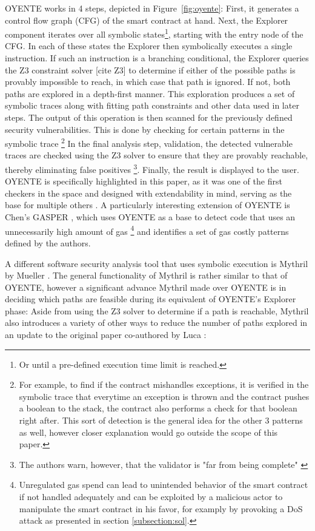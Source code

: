 \documentclass[letterpaper,twocolumn,10pt]{article}
\begin{document}
OYENTE works in 4 steps, depicted in Figure~\ref{fig:oyente}: First, it generates a control flow graph (CFG) of the smart contract at hand. Next, the Explorer component iterates over all symbolic states\footnote{Or until a pre-defined execution time limit is reached.}, starting with the entry node of the CFG. In each of these states the Explorer then symbolically executes a single instruction. If such an instruction is a branching conditional, the Explorer queries the Z3 constraint solver [cite Z3] to determine if either of the possible paths is provably impossible to reach, in which case that path is ignored. If not, both paths are explored in a depth-first manner. This exploration produces a set of symbolic traces along with fitting path constraints and other data used in later steps. The output of this operation is then scanned for the previously defined security vulnerabilities. This is done by checking for certain patterns in the symbolic trace \footnote{For example, to find if the contract mishandles exceptions, it is verified in the symbolic trace that everytime an exception is thrown and the contract pushes a boolean to the stack, the contract also performs a check for that boolean right after. This sort of detection is the general idea for the other 3 patterns as well, however closer explanation would go outside the scope of this paper.} In the final analysis step, validation, the detected vulnerable traces are checked using the Z3 solver to ensure that they are provably reachable, thereby eliminating false positives \footnote{The authors warn, however, that the validator is "far from being complete" \cite{luu_chu_olickel_saxena_hobor_2016}}. Finally, the result is displayed to the user. OYENTE is specifically highlighted in this paper, as it was one of the first checkers in the space and designed with extendability in mind, serving as the base for multiple others \cite{zhou_hua_pi_sun_nomura_yamashita_kurihara_2018}\cite{albert_gordillo_livshits_rubio_sergey_2018}. A particularly interesting extension of OYENTE is Chen's GASPER \cite{chen_li_luo_zhang_2017}, which uses OYENTE as a base to detect code that uses an unnecessarily high amount of gas \footnote{Unregulated gas spend can lead to unintended behavior of the smart contract if not handled adequately and can be exploited by a malicious actor to manipulate the smart contract in his favor, for examply by provoking a DoS attack as presented in section \ref{subsection:sol}.} and identifies a set of gas costly patterns defined by the authors. 

 A different software security analysis tool that uses symbolic execution is Mythril by Mueller \cite{mueller}. The general functionality of Mythril is rather similar to that of OYENTE, however a significant advance Mythril made over OYENTE is in deciding which paths are feasible during its equivalent of OYENTE's Explorer phase: Aside from using the Z3 solver to determine if a path is reachable, Mythril also introduces a variety of other ways to reduce the number of paths explored in an update to the original paper co-authored by Luca \cite{mueller_luca_2019}: 
\end{document}
